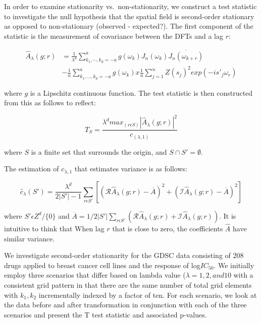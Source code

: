 \documentclass[print]{nuthesis}
\begin{document}
In order to examine stationarity vs.~non-stationarity, we construct a test statistic to investigate the null hypothesis that the spatial field is second-order stationary as opposed to non-stationary (observed - expected?). The first component of the statistic is the measurement of covariance between the DFTs and a lag \(r\):

\begin{equation}
\begin{split}
  \hat{A}_\lambda(g;r)&=\frac{1}{\lambda^{d}}\sum_{k_1,\cdots,k_d=-a}^{a}g(\omega_k)J_n(\omega_k)\overline{J_n(\omega_{k+r})}\\
  &-\frac{1}{n}\sum_{k_1,...,k_d=-a}^{a}g(\omega_k) x \frac{1}{n}\sum_{j=1}^{n}Z(s_j)^2exp(-is'_j\omega_r)
\end{split}
\end{equation}

where \(g\) is a Lipschitz continuous function. The test statistic is then constructed from this as follows to reflect:

\begin{equation}
  T_S=\frac{\lambda^d max_{\left(r \epsilon S\right)}{\left\lvert\hat{A}_\lambda\left(g;r\right) \right\rvert}^2} {c_{\left(\lambda,1\right)}}
\end{equation}

where \(S\) is a finite set that surrounds the origin, and \(S \cap S' =\emptyset\).

The estimation of \(c_{\lambda,1}\) that estimates variance is as follows:

\begin{equation}
  \hat{c}_{\lambda}(S')=\frac{\lambda^d}{2|S'|-1}\sum_{r \epsilon S'}[({\mathscr{R} \hat{A}_\lambda(g;r)-\overline{A}})^2+({\mathscr{I} \hat{A}_\lambda(g;r)-\overline{A}})^2]
\end{equation}

where \(S' \epsilon Z^d/ \{0\}\) and \(\overline{A}={{1/2|S'|}}\sum_{r \epsilon S'}({\mathscr{R} \hat{A}_\lambda(g;r)+\mathscr{I} \hat{A}_\lambda(g;r)})\). It is intuitive to think that When lag \(r\) that is close to zero, the coefficients \(\hat{A}\) have similar variance.

We investigate second-order stationarity for the GDSC data consisting of 208 drugs applied to breast cancer cell lines and the response of log\(IC_\text{50}\). We initially employ three scenarios that differ based on lambda value (\(\lambda = 1, 2, and 10\) with a consistent grid pattern in that there are the same number of total grid elements with \(k_1 , k_2\) incrementally indexed by a factor of ten. For each scenario, we look at the data before and after transformation in conjunction with each of the three scenarios and present the T test statistic and associated p-values.
\end{document}
